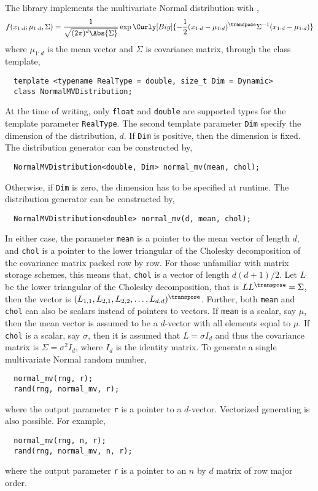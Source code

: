 The library implements the multivariate Normal distribution with \pdf,
\begin{equation*}
  f(x_{1:d};\mu_{1:d},\Sigma) = \frac{1}{\sqrt{(2\pi)^d\Abs{\Sigma}}}
  \exp\Curly[Big]{-\frac{1}{2}
    (x_{1:d} - \mu_{1:d})^{\transpose}\Sigma^{-1}(x_{1:d} - \mu_{1:d})}
\end{equation*}
where $\mu_{1:d}$ is the mean vector and $\Sigma$ is covariance matrix, through
the class template,
\begin{Verbatim}
  template <typename RealType = double, size_t Dim = Dynamic>
  class NormalMVDistribution;
\end{Verbatim}
At the time of writing, only \verb|float| and \verb|double| are supported types
for the template parameter \verb|RealType|. The second template parameter
\verb|Dim| specify the dimension of the distribution, $d$. If \verb|Dim| is
positive, then the dimension is fixed. The distribution generator can be
constructed by,
\begin{Verbatim}
  NormalMVDistribution<double, Dim> normal_mv(mean, chol);
\end{Verbatim}
Otherwise, if \verb|Dim| is zero, the dimension has to be specified at runtime.
The distribution generator can be constructed by,
\begin{Verbatim}
  NormalMVDistribution<double> normal_mv(d, mean, chol);
\end{Verbatim}
In either case, the parameter \verb|mean| is a pointer to the mean vector of
length $d$, and \verb|chol| is a pointer to the lower triangular of the
Cholesky decomposition of the covariance matrix packed row by row. For those
unfamiliar with matrix storage schemes, this means that, \verb|chol| is a
vector of length $d(d+1)/2$. Let $L$ be the lower triangular of the Cholesky
decomposition, that is $LL^{\transpose} = \Sigma$, then the vector is
$(L_{1,1},L_{2,1},L_{2,2},\dots,L_{d,d})^{\transpose}$. Further, both
\verb|mean| and \verb|chol| can also be scalars instead of pointers to vectors.
If \verb|mean| is a scalar, say $\mu$, then the mean vector is assumed to be a
$d$-vector with all elements equal to $\mu$. If \verb|chol| is a scalar, say
$\sigma$, then it is assumed that $L = \sigma I_d$ and thus the covariance
matrix is $\Sigma = \sigma^2 I_d$, where $I_d$ is the identity matrix. To
generate a single multivariate Normal random number,
\begin{Verbatim}
  normal_mv(rng, r);
  rand(rng, normal_mv, r);
\end{Verbatim}
where the output parameter \verb|r| is a pointer to a $d$-vector. Vectorized
generating is also possible. For example,
\begin{Verbatim}
  normal_mv(rng, n, r);
  rand(rng, normal_mv, n, r);
\end{Verbatim}
where the output parameter \verb|r| is a pointer to an $n$ by $d$ matrix of row
major order.

